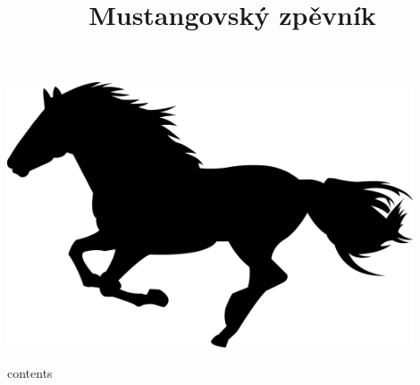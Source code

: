 \documentclass[11pt]{article}
\title{\Huge{Mustangovský zpěvník}}
\date{}
\begin{document}
	\maketitle
	\thispagestyle{empty}
	\includegraphics[width=0.9\textwidth]{cover}
	\newpage
	

	\begin{songs}{contents}
	
	\end{songs}

\end{document}
